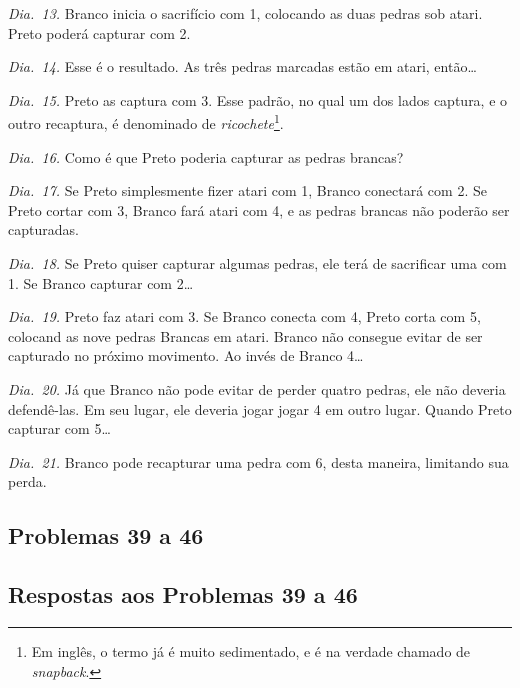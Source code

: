 \emph{Dia.\@~13.} Branco inicia o sacrifício com 1, colocando as duas pedras sob atari. Preto poderá capturar com 2.

\emph{Dia.\@~14.} Esse é o resultado. As três pedras marcadas estão em atari, então\ldots

\emph{Dia.\@~15.} Preto as captura com 3. Esse padrão, no qual um dos lados captura, e o outro recaptura, é denominado de \emph{ricochete}\footnote{Em inglês, o termo já é muito sedimentado, e é na verdade chamado de \emph{snapback}.}.

\emph{Dia.\@~16.} Como é que Preto poderia capturar as pedras brancas?

\emph{Dia.\@~17.} Se Preto simplesmente fizer atari com 1, Branco conectará com 2. Se Preto cortar com 3, Branco fará atari com 4, e as pedras brancas não poderão ser capturadas.

\emph{Dia.\@~18.} Se Preto quiser capturar algumas pedras, ele terá de sacrificar uma com 1. Se Branco capturar com 2\ldots

\emph{Dia.\@~19.} Preto faz atari com 3. Se Branco conecta com 4, Preto corta com 5, colocand as nove pedras Brancas em atari. Branco não consegue evitar de ser capturado no próximo movimento. Ao invés de Branco 4\ldots

\emph{Dia.\@~20.} Já que Branco não pode evitar de perder quatro pedras, ele não deveria defendê-las. Em seu lugar, ele deveria jogar jogar 4 em outro lugar. Quando Preto capturar com 5\ldots

\emph{Dia.\@~21.} Branco pode recapturar uma pedra com 6, desta maneira, limitando sua perda.

\subsection{Problemas 39 a 46}

\subsection{Respostas aos Problemas 39 a 46}

